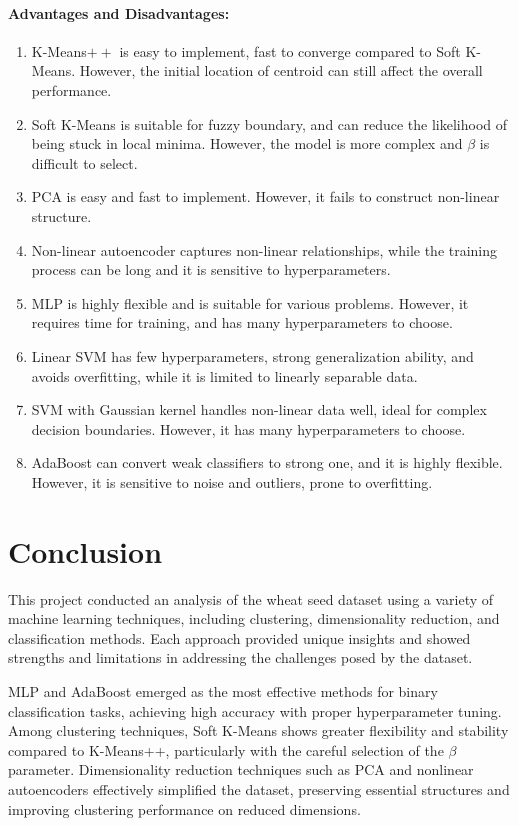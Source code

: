 \documentclass{article}
\begin{document}
\paragraph{Advantages and Disadvantages:}
\begin{enumerate}
    \item K-Means$++$ is easy to implement, fast to converge compared to Soft K-Means. However, the initial location of centroid can still affect the overall performance.
    \item Soft K-Means is suitable for fuzzy boundary, and can reduce the likelihood of being stuck in local minima. However, the model is more complex and $\beta$ is difficult to select.
    \item PCA is easy and fast to implement. However, it fails to construct non-linear structure.
    \item Non-linear autoencoder captures non-linear relationships, while the training process can be long and it is sensitive to hyperparameters.
    \item MLP is highly flexible and is suitable for various problems. However, it requires time for training, and has many hyperparameters to choose.
    \item Linear SVM has few hyperparameters, strong generalization ability, and avoids overfitting, while it is limited to linearly separable data.
    \item SVM with Gaussian kernel handles non-linear data well, ideal for complex decision boundaries. However, it has many hyperparameters to choose.
    \item AdaBoost can convert weak classifiers to strong one, and it is highly flexible. However, it is sensitive to noise and outliers, prone to overfitting.
\end{enumerate}


\section{Conclusion}
This project conducted an analysis of the wheat seed dataset using a variety of machine learning techniques, including clustering, dimensionality reduction, and classification methods. Each approach provided unique insights and showed strengths and limitations in addressing the challenges posed by the dataset.

MLP and AdaBoost emerged as the most effective methods for binary classification tasks, achieving high accuracy with proper hyperparameter tuning. Among clustering techniques, Soft K-Means shows greater flexibility and stability compared to K-Means++, particularly with the careful selection of the $\beta$ parameter. Dimensionality reduction techniques such as PCA and nonlinear autoencoders effectively simplified the dataset, preserving essential structures and improving clustering performance on reduced dimensions.
\end{document}
